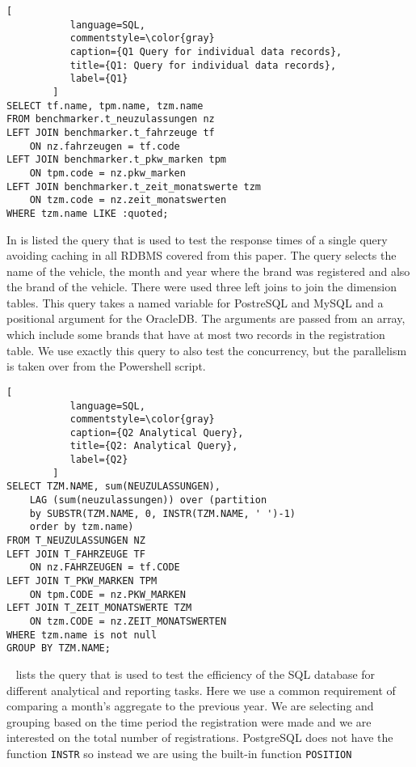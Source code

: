 \documentclass[runningheads]{llncs}
\begin{document}
\begin{lstlisting}[
           language=SQL,
           commentstyle=\color{gray}
           caption={Q1 Query for individual data records},
           title={Q1: Query for individual data records},
           label={Q1}
        ]
SELECT tf.name, tpm.name, tzm.name
FROM benchmarker.t_neuzulassungen nz
LEFT JOIN benchmarker.t_fahrzeuge tf 
    ON nz.fahrzeugen = tf.code
LEFT JOIN benchmarker.t_pkw_marken tpm 
    ON tpm.code = nz.pkw_marken
LEFT JOIN benchmarker.t_zeit_monatswerte tzm 
    ON tzm.code = nz.zeit_monatswerten
WHERE tzm.name LIKE :quoted;
\end{lstlisting}

In  is listed the query that is used to test the response times of a single query avoiding caching in all RDBMS covered from this paper. The query selects the name of the vehicle, the month and year where the brand was registered and also the brand of the vehicle. There were used three left joins to join the dimension tables. This query takes a named variable for PostreSQL and MySQL and a positional argument for the OracleDB. The arguments are passed from an array, which include some brands that have at most two records in the registration table. We use exactly this query to also test the concurrency, but the parallelism is taken over from the Powershell script.

\begin{lstlisting}[
           language=SQL,
           commentstyle=\color{gray}
           caption={Q2 Analytical Query},
           title={Q2: Analytical Query},
           label={Q2}
        ]
SELECT TZM.NAME, sum(NEUZULASSUNGEN), 
    LAG (sum(neuzulassungen)) over (partition 
    by SUBSTR(TZM.NAME, 0, INSTR(TZM.NAME, ' ')-1) 
    order by tzm.name)
FROM T_NEUZULASSUNGEN NZ
LEFT JOIN T_FAHRZEUGE TF 
    ON nz.FAHRZEUGEN = tf.CODE
LEFT JOIN T_PKW_MARKEN TPM 
    ON tpm.CODE = nz.PKW_MARKEN
LEFT JOIN T_ZEIT_MONATSWERTE TZM 
    ON tzm.CODE = nz.ZEIT_MONATSWERTEN
WHERE tzm.name is not null
GROUP BY TZM.NAME;
\end{lstlisting}

~ lists the query that is used to test the efficiency of the SQL database for different analytical and reporting tasks. Here we use a common requirement of comparing a month's aggregate to the previous year. We are selecting and grouping based on the time period the registration were made and we are interested on the total number of registrations. PostgreSQL does not have the function \verb+INSTR+ so instead we are using the built-in function \verb+POSITION+
\end{document}
